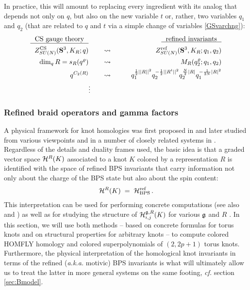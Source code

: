 \documentclass[hyper,letterpaper]{JHEP3}
\newcommand{\be}{\begin{equation}}
\newcommand{\ee}{\end{equation}}
\newcommand{\cH}{{\cal H }}
\renewcommand{\S}{{\bf S}}
\begin{document}
In practice, this will amount to replacing every ingredient with its analog that
depends not only on $q$, but also on the new variable $t$ or, rather,
two variables $q_1$ and $q_2$ (that are related to $q$ and $t$ via a simple change of variables \eqref{GSvarchng}):
\begin{eqnarray}
\underline{\text{~~CS gauge theory~~}} && \underline{\text{~~refined invariants~~}}
\nonumber \\
Z_{SU(N)}^{\rm CS}(\S^3,K_R;q)
&\qquad \leadsto \qquad&
Z^{\text{ref}}_{SU(N)}(\S^3,K_R;q_1,q_2)
\nonumber \\
\dim_q R = s_R(q^{\varrho})
&\qquad \leadsto \qquad&
M_R(q_2^{\varrho};q_1,q_2)
\nonumber \\
q^{C_2(R)}
&\qquad \leadsto \qquad&
q_1^{\frac{1}{2}||R||^2}q_2^{-\frac{1}{2}||R^{t}||^2}q_2^{\frac{N}{2}|R|}q_1^{-\frac{1}{2N}|R|^2}
\label{Casimir_ref} \\
& \vdots & \nonumber
\end{eqnarray}


\subsubsection{Refined braid operators and gamma factors}
\label{sec:refinedbraid}

A physical framework for knot homologies was first proposed in \cite{GSV} and later studied from various viewpoints
and in a number of closely related systems in \cite{Gknothom,Wknothom,DGH,AS}.
Regardless of the details and duality frames used, the basic idea is that a graded vector space $\cH^{R} (K)$
associated to a knot $K$ colored by a representation $R$ is identified with the space of refined BPS invariants
that carry information not only about the charge of the BPS state but also about the spin content:
\be
\cH^R (K) \; = \; \cH^{\text{ref}}_{\text{BPS}} \, .
\label{HHBPS}
\ee
This interpretation can be used for performing concrete computations
\cite{GIKV,AS,IK11} (see also
\cite{Taki:2008hb,Awata:2009yc,Awata:2009sz} and \cite{Carqueville:2011sj,ORSG,Aganagic:2012au})
as well as for studying the structure of $\cH^{\frak g, R}_{i,j} (K)$ for various $\frak g$ and $R$ \cite{GWalcher,GS}.
In this section, we will use both methods -- based on concrete formulas for torus knots and on structural properties for arbitrary knots --
to compute colored HOMFLY homology and colored superpolynomials of $(2,2p+1)$ torus knots.
Furthermore, the physical interpretation of the homological knot invariants in terms of the refined ({\it a.k.a.} motivic) BPS invariants
is what will ultimately allow us to treat the latter in more general systems on the same footing, {\it cf.} section \ref{sec:Bmodel}.
\end{document}
